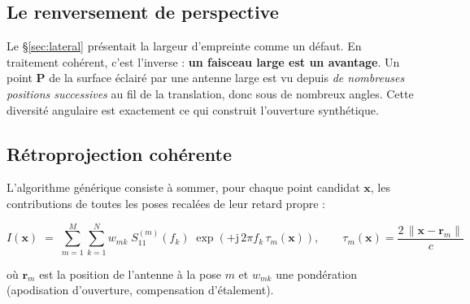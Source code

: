 \documentclass[11pt,a4paper]{article}
\newcommand{\jj}{\mathrm{j}}
\begin{document}
\subsection{Le renversement de perspective}

Le \S\ref{sec:lateral} présentait la largeur d'empreinte comme un défaut. En
traitement cohérent, c'est l'inverse : \textbf{un faisceau large est un
avantage}. Un point $\mathbf{P}$ de la surface éclairé par une antenne large est
vu depuis \emph{de nombreuses positions successives} au fil de la translation,
donc sous de nombreux angles. Cette diversité angulaire est exactement ce qui
construit l'ouverture synthétique.

\begin{center}
\end{center}

\subsection{Rétroprojection cohérente}

L'algorithme générique consiste à sommer, pour chaque point candidat
$\mathbf{x}$, les contributions de toutes les poses recalées de leur retard
propre :

\begin{equation}
I(\mathbf{x}) \;=\; \sum_{m=1}^{M}\sum_{k=1}^{N}
   w_{mk}\; S_{11}^{(m)}(f_k)\;
   \exp\!\left(+\jj\,2\pi f_k\,\tau_m(\mathbf{x})\right),
\qquad
\tau_m(\mathbf{x}) = \frac{2\,\|\mathbf{x}-\mathbf{r}_m\|}{c}
\label{eq:bp}
\end{equation}

où $\mathbf{r}_m$ est la position de l'antenne à la pose $m$ et $w_{mk}$ une
pondération (apodisation d'ouverture, compensation d'étalement).
\end{document}
